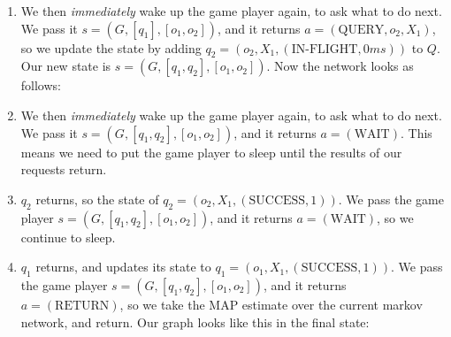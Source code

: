 \begin{enumerate}
\item We then \textit{immediately} wake up the game player again, to ask what to do next.
 We pass it $s = (G, [q_1], [o_1, o_2])$, and it returns $a = (\text{QUERY}, o_2, X_1)$, so we update the state by adding $q_2 = (o_2, X_1, (\text{IN-FLIGHT}, 0ms))$ to $Q$.
 Our new state is $s = (G, [q_1, q_2], [o_1, o_2])$.
 Now the network looks as follows:

\begin{center}
\end{center}

\item We then \textit{immediately} wake up the game player again, to ask what to do next.
 We pass it $s = (G, [q_1, q_2], [o_1, o_2])$, and it returns $a = (\text{WAIT})$.
 This means we need to put the game player to sleep until the results of our requests return.

\item $q_2$ returns, so the state of $q_2 = (o_2, X_1, (\text{SUCCESS}, 1))$.
 We pass the game player $s = (G, [q_1, q_2], [o_1, o_2])$, and it returns $a = (\text{WAIT})$, so we continue to sleep.

\item $q_1$ returns, and updates its state to $q_1 = (o_1, X_1, (\text{SUCCESS}, 1))$.
 We pass the game player $s = (G, [q_1, q_2], [o_1, o_2])$, and it returns $a = (\text{RETURN})$, so we take the MAP estimate over the current markov network, and return.
 Our graph looks like this in the final state:

\begin{center}
\end{center}

\end{enumerate}

